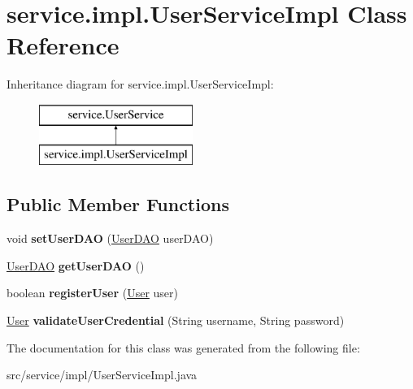 \hypertarget{classservice_1_1impl_1_1_user_service_impl}{}\section{service.\+impl.\+User\+Service\+Impl Class Reference}
\label{classservice_1_1impl_1_1_user_service_impl}
Inheritance diagram for service.\+impl.\+User\+Service\+Impl\+:\begin{figure}[H]
\begin{center}
\leavevmode
\includegraphics[height=2.000000cm]{classservice_1_1impl_1_1_user_service_impl}
\end{center}
\end{figure}
\subsection*{Public Member Functions}
\begin{DoxyCompactItemize}
\item 
\mbox{\label{classservice_1_1impl_1_1_user_service_impl_af730727180fc704b8c0a0b8849431012}} 
void {\bfseries set\+User\+D\+AO} (\mbox{\hyperlink{interfacedao_1_1_user_d_a_o}{User\+D\+AO}} user\+D\+AO)
\item 
\mbox{\label{classservice_1_1impl_1_1_user_service_impl_a35d326db6a04cdaf680d59ecfcf1a887}} 
\mbox{\hyperlink{interfacedao_1_1_user_d_a_o}{User\+D\+AO}} {\bfseries get\+User\+D\+AO} ()
\item 
\mbox{\label{classservice_1_1impl_1_1_user_service_impl_a11d9956ff2936f4541b17d3dd5780ba4}} 
boolean {\bfseries register\+User} (\mbox{\hyperlink{classmodel_1_1_user}{User}} user)
\item 
\mbox{\label{classservice_1_1impl_1_1_user_service_impl_a13ad8f7d06c99cb7d2906fd8536ad37f}} 
\mbox{\hyperlink{classmodel_1_1_user}{User}} {\bfseries validate\+User\+Credential} (String username, String password)
\end{DoxyCompactItemize}


The documentation for this class was generated from the following file\+:\begin{DoxyCompactItemize}
\item 
src/service/impl/User\+Service\+Impl.\+java\end{DoxyCompactItemize}
